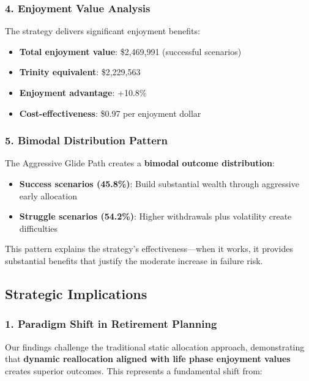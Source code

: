 \documentclass[11pt,letterpaper]{article}
\begin{document}
\subsubsection{4. Enjoyment Value Analysis}

The strategy delivers significant enjoyment benefits:

\begin{itemize}
\item \textbf{Total enjoyment value}: \$2,469,991 (successful scenarios)
\item \textbf{Trinity equivalent}: \$2,229,563
\item \textbf{Enjoyment advantage}: +10.8\%
\item \textbf{Cost-effectiveness}: \$0.97 per enjoyment dollar
\end{itemize}

\subsubsection{5. Bimodal Distribution Pattern}

The Aggressive Glide Path creates a \textbf{bimodal outcome distribution}:

\begin{itemize}
\item \textbf{Success scenarios (45.8\%)}: Build substantial wealth through aggressive early allocation
\item \textbf{Struggle scenarios (54.2\%)}: Higher withdrawals plus volatility create difficulties
\end{itemize}

This pattern explains the strategy's effectiveness—when it works, it provides substantial benefits that justify the moderate increase in failure risk.




\subsection{Strategic Implications}

\subsubsection{1. Paradigm Shift in Retirement Planning}

Our findings challenge the traditional static allocation approach, demonstrating that \textbf{dynamic reallocation aligned with life phase enjoyment values} creates superior outcomes. This represents a fundamental shift from:
\end{document}
